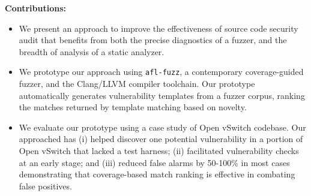 \noindent
{\bf Contributions:}
\begin{itemize}
\item We present an approach to improve the effectiveness of source code security audit that benefits from both the precise diagnostics of a fuzzer, and the breadth of analysis of a static analyzer.
\item We prototype our approach using {\tt afl-fuzz}, a contemporary coverage-guided fuzzer, and the Clang/LLVM compiler toolchain.
Our prototype automatically generates vulnerability templates from a fuzzer corpus, ranking the matches returned by template matching based on novelty.
\item We evaluate our prototype using a case study of Open vSwitch codebase.
Our approached has (i) helped discover one potential vulnerability in a portion of Open vSwitch that lacked a test harness; (ii) facilitated vulnerability checks at an early stage; and (iii) reduced false alarms by 50-100\% in most cases demonstrating that coverage-based match ranking is effective in combating false positives.
\end{itemize}

\begin{figure*}[t]
  \centering
\begin{minipage}[t]{.43\linewidth}

\end{minipage}
\quad
\begin{minipage}[t]{.46\linewidth}
    
\end{minipage}
\end{figure*}
